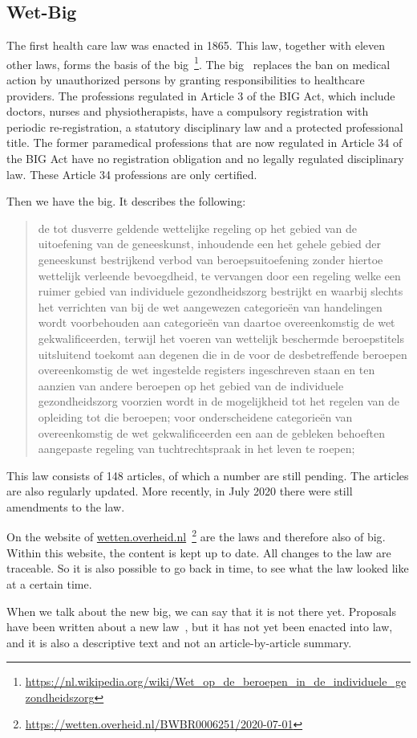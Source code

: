\subsection{Wet-Big} \label{big}
The first health care law was enacted in 1865.
This law, together with eleven other laws, forms the basis of the \acrfull{big}~\footnote{\url{https://nl.wikipedia.org/wiki/Wet_op_de_beroepen_in_de_individuele_gezondheidszorg}}.
The \acrshort{big}~ replaces the ban on medical action by unauthorized persons by granting responsibilities to healthcare providers.
The professions regulated in Article 3 of the BIG Act, which include doctors, nurses and physiotherapists, have a compulsory registration with periodic re-registration, a statutory disciplinary law and a protected professional title.
The former paramedical professions that are now regulated in Article 34 of the BIG Act have no registration obligation and no legally regulated disciplinary law.
These Article 34 professions are only certified.

Then we have the \acrshort{big}.
It describes the following:
\blockquote{de tot dusverre geldende wettelijke regeling op het gebied van de uitoefening van de geneeskunst, inhoudende een het gehele gebied der geneeskunst bestrijkend verbod van beroepsuitoefening zonder hiertoe wettelijk verleende bevoegdheid, te vervangen door een regeling welke een ruimer gebied van individuele gezondheidszorg bestrijkt en waarbij slechts het verrichten van bij de wet
aangewezen categorieën van handelingen wordt voorbehouden aan categorieën van daartoe overeenkomstig de wet gekwalificeerden, terwijl het voeren van wettelijk beschermde beroepstitels uitsluitend toekomt aan degenen die in de voor de desbetreffende beroepen overeenkomstig de wet ingestelde registers ingeschreven staan en ten aanzien van andere beroepen op het gebied van de individuele gezondheidszorg voorzien wordt in de mogelijkheid tot het regelen van de opleiding tot die beroepen; 
\newline
voor onderscheidene categorieën van overeenkomstig de wet gekwalificeerden een aan de gebleken behoeften aangepaste regeling van tuchtrechtspraak in het leven te roepen; }
This law consists of 148 articles, of which a number are still pending.
The articles are also regularly updated.
More recently, in July 2020 there were still amendments to the law.

On the  website of {\url{wetten.overheid.nl}}~\footnote{\url{https://wetten.overheid.nl/BWBR0006251/2020-07-01}} are the laws and therefore also of \acrfull{big}.
Within this website, the content is kept up to date.
All changes to the law are traceable.
So it is also possible to go back in time, to see what the law looked like at a certain time.

When we talk about the new \acrshort{big}, we can say that it is not there yet.
Proposals have been written about a new law~, but it has not yet been enacted into law, and it is also a descriptive text and not an article-by-article summary.

